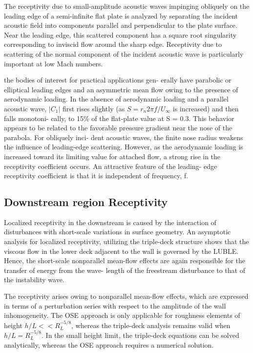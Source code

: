 \documentclass[twoside]{iitbreport}
\begin{document}
The receptivity due to small-amplitude acoustic waves impinging
obliquely on the leading edge of a semi-infinite flat plate is analyzed by
separating the incident acoustic field into components parallel and
perpendicular to the plate surface. Near the leading edge, this scattered
component has a square root singularity corresponding to inviscid flow
around the sharp edge. Receptivity due to scattering of the normal component
of the incident acoustic wave is particularly important at low Mach
numbers.

the bodies of interest for practical applications gen-
erally have parabolic or elliptical leading edges and an asymmetric mean flow
owing to the presence of aerodynamic loading. In the absence of aerodynamic loading and a parallel
acoustic wave, $|C_1 |$ first rises slightly (as $S = r_{n} 2 \pi f /
U_\infty$  is increased) and then falls monotoni-
cally, to 15\% of the flat-plate value at S = 0.3. This behavior appears to be related
to the favorable pressure gradient near the nose of the parabola. For obliquely inci-
dent acoustic waves, the finite nose radius weakens the influence of leading-edge
scattering. However, as the aerodynamic
loading is increased toward its limiting value for attached flow, a strong rise in
the receptivity coefficient occurs. An attractive feature of the leading-
edge receptivity coefficient is that it is independent of frequency, f.

\subsection{Downstream region Receptivity }
Localized receptivity in the downstream is caused by the interaction of disturbances with short-scale
variations in surface geometry. An asymptotic analysis for localized receptivity,
utilizing the triple-deck structure shows that the viscous flow in the lower deck adjacent
to the wall is governed by the LUBLE. Hence, the short-scale nonparallel
mean-flow effects are again responsible for the transfer of energy from the wave-
length of the freestream disturbance to that of the instability wave.

The receptivity arises owing to nonparallel mean-flow effects, which
are expressed in terms of a perturbation series with respect to the amplitude of
the wall inhomogeneity. The OSE approach is only applicable for roughness elements of height
$h/L << R^{-5/8}_{L}$, whereas the triple-deck analysis remains valid when
$h/L = R^{-5/8}_{L}$. In the small height limit, the triple-deck equations can be solved
analytically, whereas the OSE approach requires a numerical solution.
\end{document}
